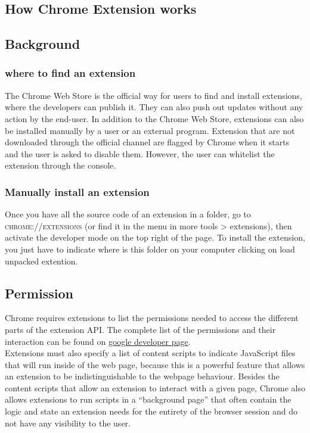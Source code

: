 \documentclass[12pt]{article}
\begin{document}
\begin{multicols}{2}
\section*{How Chrome Extension works}
\subsection*{Background}
\subsubsection*{where to find an extension}
The Chrome Web Store is the official way for users
to find and install extensions, where the developers can publish it. They can also push out updates without any action
by the end-user.
In addition to the Chrome Web Store, extensions can
also be installed manually by a user or an external program.
Extension that are not downloaded through the official channel are flagged by Chrome when it starts	and the user is asked to disable them.
However, the user can whitelist the extension through the console.
\subsubsection*{Manually install an extension}
	Once you have all the source code of an extension in a folder, go to  \textsc{chrome://extensions} (or find it in the menu in more tools > extensions), then activate the developer mode on the top right of the page. To install the extension, you just have to indicate where is this folder on your computer clicking on load unpacked extention.
\subsection*{Permission}
Chrome requires extensions to list the
permissions needed to access the different parts of the
extension API. The complete list of the permissions and their interaction can be found on \href{https://developer.chrome.com/extensions/declare_permissions}{google developer page}.\\
Extensions must also specify a list of content scripts to indicate
JavaScript files that will run inside of the web page, because this is a powerful feature that allows an extension to be indistinguishable to the webpage behaviour. Besides the content scripts that
allow an extension to interact with a given page,
Chrome also allows extensions to run scripts in a
“background page” that often contain the
logic and state an extension needs for the entirety
of the browser session and do not have any visibility
to the user.\\

\end{multicols}
\end{document}
